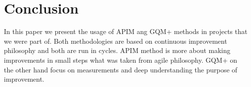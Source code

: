 \section{Conclusion}

In this paper we present the usage of APIM ang GQM+ methods in projects that we were part of. Both methodologies are based on continuous improvement philosophy and both are run in cycles. APIM method is more about making improvements in small steps what was taken from agile philosophy. GQM+ on the other hand focus on measurements and deep understanding the purpose of improvement. 
